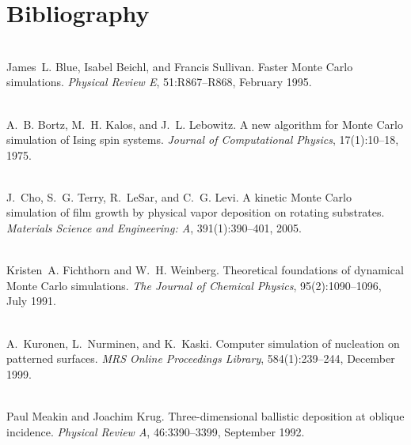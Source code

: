 \chapter{Bibliography}
\hypertarget{citelist}{}\label{citelist}

\begin{DoxyDescription}
\item[\label{citelist_CITEREF_blu95}%
\Hypertarget{citelist_CITEREF_blu95}%
\mbox{[}1\mbox{]}]\hfill \\
James~L. Blue, Isabel Beichl, and Francis Sullivan. Faster Monte Carlo simulations. {\itshape Physical Review E}, 51\+:R867--R868, February 1995.


\item[\label{citelist_CITEREF_bor75}%
\Hypertarget{citelist_CITEREF_bor75}%
\mbox{[}2\mbox{]}]\hfill \\
A.~B. Bortz, M.~H. Kalos, and J.~L. Lebowitz. A new algorithm for Monte Carlo simulation of Ising spin systems. {\itshape Journal of Computational Physics}, 17(1)\+:10--18, 1975.


\item[\label{citelist_CITEREF_cho05}%
\Hypertarget{citelist_CITEREF_cho05}%
\mbox{[}3\mbox{]}]\hfill \\
J.~Cho, S.~G. Terry, R.~Le\+Sar, and C.~G. Levi. A kinetic Monte Carlo simulation of film growth by physical vapor deposition on rotating substrates. {\itshape Materials Science and Engineering\+: A}, 391(1)\+:390--401, 2005.


\item[\label{citelist_CITEREF_fic91}%
\Hypertarget{citelist_CITEREF_fic91}%
\mbox{[}4\mbox{]}]\hfill \\
Kristen~A. Fichthorn and W.~H. Weinberg. Theoretical foundations of dynamical Monte Carlo simulations. {\itshape The Journal of Chemical Physics}, 95(2)\+:1090--1096, July 1991.


\item[\label{citelist_CITEREF_kur99}%
\Hypertarget{citelist_CITEREF_kur99}%
\mbox{[}5\mbox{]}]\hfill \\
A.~Kuronen, L.~Nurminen, and K.~Kaski. Computer simulation of nucleation on patterned surfaces. {\itshape MRS Online Proceedings Library}, 584(1)\+:239--244, December 1999.


\item[\label{citelist_CITEREF_meakin92}%
\Hypertarget{citelist_CITEREF_meakin92}%
\mbox{[}6\mbox{]}]\hfill \\
Paul Meakin and Joachim Krug. Three-\/dimensional ballistic deposition at oblique incidence. {\itshape Physical Review A}, 46\+:3390--3399, September 1992.



\end{DoxyDescription}
